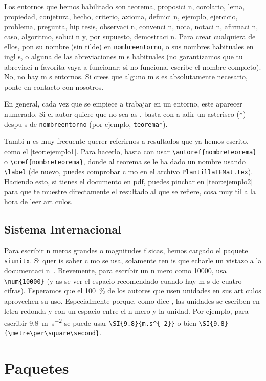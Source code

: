 \documentclass{article}
\begin{document}
Los entornos que hemos habilitado son teorema, proposici n, corolario, lema, propiedad, conjetura, hecho, criterio, axioma, definici n, ejemplo, ejercicio, problema, pregunta, hip tesis, observaci n, convenci n, nota, notaci n, afirmaci n, caso, algoritmo, soluci n y, por supuesto, demostraci n.
Para crear cualquiera de ellos, pon su nombre (sin tilde) en \verb+nombreentorno+, o sus nombres habituales en ingl s, o alguna de las abreviaciones m s habituales (no garantizamos que tu abreviaci n favorita vaya a funcionar; si no funciona, escribe el nombre completo).
No, no hay m s entornos.
Si crees que alguno m s es absolutamente necesario, ponte en contacto con nosotros.

En general, cada vez que se empiece a trabajar en un entorno, este aparecer  numerado.
Si el autor quiere que no sea as , basta con a adir un asterisco (\verb+*+) despu s de \verb+nombreentorno+ (por ejemplo, \verb+teorema*+).

Tambi n es muy frecuente querer referirnos a resultados que ya hemos escrito, como el \autoref{teor:ejemplo1}. Para hacerlo, basta con usar \verb+\autoref{nombreteorema}+ o \verb+\cref{nombreteorema}+, donde al teorema se le ha dado un nombre usando \verb+\label+ (de nuevo, puedes comprobar c mo en el archivo \verb+PlantillaTEMat.tex+).
Haciendo esto, si tienes el documento en pdf, puedes pinchar en \autoref{teor:ejemplo2} para que te muestre directamente el resultado al que se refiere, cosa muy  til a la hora de leer art culos.

\subsection{Sistema Internacional}

Para escribir n meros grandes o magnitudes f sicas, hemos cargado el paquete \verb+siunitx+.
Si quer is saber c mo se usa, solamente ten is que echarle un vistazo a la documentaci n~\cite{siunitx}.
Brevemente, para escribir un n mero como \num{10000}, usa \verb+\num{10000}+ (y as  se ver  el espacio recomendado cuando hay m s de cuatro cifras).
Esperamos que el \SI{100}{\percent} de los autores que usen unidades en sus art culos aprovechen su uso.
Especialmente porque, como dice \citet{bezosOM}, las unidades se escriben en letra redonda y con un espacio entre el n mero y la unidad.
Por ejemplo, para escribir \SI{9.8}{m.s^{-2}} se puede usar \verb+\SI{9.8}{m.s^{-2}}+ o bien \verb+\SI{9.8}{\metre\per\square\second}+.

\section{Paquetes}
\end{document}
